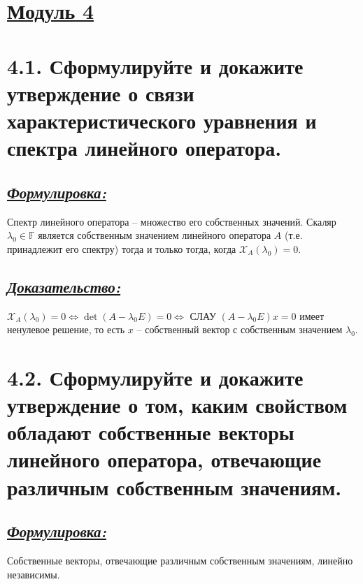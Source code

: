 \documentclass{article}
\begin{document}
\newpage
{}
\section*{\LARGE\centering \underline{Модуль 4}}

\section*{\LARGE 4.1. Сформулируйте и докажите утверждение о связи характеристического уравнения и спектра линейного оператора.  }
\subsection*{\Large \underline{\textit{Формулировка: }}}
Спектр линейного оператора -- множество его собственных значений.
\newline Скаляр $\lambda_0 \in \mathbb{F}$ является собственным значением линейного оператора $A$ (т.е. принадлежит его спектру) тогда и только тогда, когда $\mathcal{X}_A(\lambda_0) = 0$.

\subsection*{\Large \underline{\textit{Доказательство: }}}
$\mathcal{X}_A(\lambda_0) = 0 \Leftrightarrow \det{(A - \lambda_0 E)} = 0 \Leftrightarrow$ СЛАУ $(A - \lambda_0 E)x = 0$ имеет ненулевое решение, то есть $x$ -- собственный вектор с собственным значением $\lambda_0$.

\section*{\LARGE 4.2. Сформулируйте и докажите утверждение о том, каким свойством обладают собственные векторы линейного оператора, отвечающие различным собственным значениям.  }
\subsection*{\Large \underline{\textit{Формулировка: }}}
Собственные векторы, отвечающие различным собственным значениям, линейно независимы.
\end{document}
